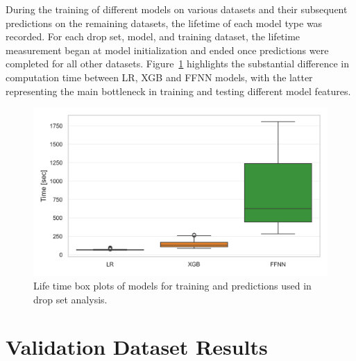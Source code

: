 During the training of different models on various datasets and their subsequent predictions on the remaining datasets,
the lifetime of each model type was recorded.
For each drop set, model, and training dataset, the lifetime measurement began at model initialization and ended once
predictions were completed for all other datasets. Figure~\ref{fig:lifetime_model} highlights the substantial difference in computation time
between \gls{LR}, \gls{XGB} and \gls{FFNN} models, with the latter representing the main bottleneck in training and testing different model features.

\begin{figure}[!ht]
    \begin{center}
        \includegraphics[width = .7\textwidth]{pictures/feature_filter/life_time_models.png}
        \caption{Life time box plots of models for training and predictions used in drop set analysis.}
        \label{fig:lifetime_model}
    \end{center}
\end{figure}

\clearpage
\section{Validation Dataset Results}
\label{app:se:validation_results}

